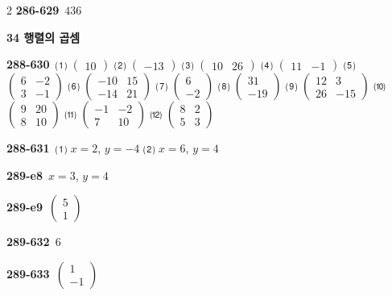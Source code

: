 \documentclass[10pt,a4paper]{article}
\begin{document}
\begin{multicols}{2}
\noindent\textbf{286-629}\ $436$\par
\noindent\textbf{34 행렬의 곱셈}\par\smallskip
\noindent\textbf{288-630}\ ⑴ $\begin{pmatrix} 10 \end{pmatrix}$ ⑵ $\begin{pmatrix} -13 \end{pmatrix}$ ⑶ $\begin{pmatrix} 10 & 26 \end{pmatrix}$ ⑷ $\begin{pmatrix} 11 & -1 \end{pmatrix}$ ⑸ $\begin{pmatrix} 6 & -2 \\ 3 & -1 \end{pmatrix}$ ⑹ $\begin{pmatrix} -10 & 15 \\ -14 & 21 \end{pmatrix}$ ⑺ $\begin{pmatrix} 6 \\ -2 \end{pmatrix}$ ⑻ $\begin{pmatrix} 31 \\ -19 \end{pmatrix}$ ⑼ $\begin{pmatrix} 12 & 3 \\ 26 & -15 \end{pmatrix}$ ⑽ $\begin{pmatrix} 9 & 20 \\ 8 & 10 \end{pmatrix}$ ⑾ $\begin{pmatrix} -1 & -2 \\ 7 & 10 \end{pmatrix}$ ⑿ $\begin{pmatrix} 8 & 2 \\ 5 & 3 \end{pmatrix}$\par
\noindent\textbf{288-631}\ ⑴ $x=2$, $y=-4$ ⑵ $x=6$, $y=4$\par
\noindent\textbf{289-e8}\ $x=3$, $y=4$\par
\noindent\textbf{289-e9}\ $\begin{pmatrix} 5 \\ 1 \end{pmatrix}$\par
\noindent\textbf{289-632}\ $6$\par
\noindent\textbf{289-633}\ $\begin{pmatrix} 1 \\ -1 \end{pmatrix}$\par

\end{multicols}
\end{document}
